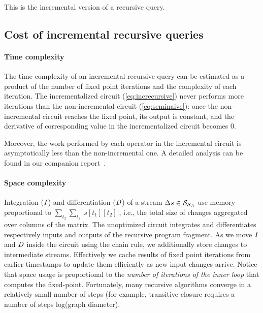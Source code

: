 \noindent This is the incremental version of a recursive query.



\subsection{Cost of incremental recursive queries}

\paragraph{Time complexity}

The time complexity of an incremental recursive query can be estimated as a product of
the number of fixed point iterations and the complexity of each iteration. The
incrementalized circuit (\ref{eq:increcursive}) never performs more
iterations than the non-incremental circuit (\ref{eq:seminaive}):
once the non-incremental circuit reaches the fixed point, its output is constant,
and the derivative of corresponding value in the incrementalized circuit becomes 0.

Moreover, the work performed by each operator in the incremental
circuit is asymptotically less than the non-incremental one.  A
detailed analysis can be found in our companion report~\cite{tr}.


\paragraph{Space complexity} Integration ($\mathit{I}$) and differentiation ($\mathit{D}$) of a
stream $\Delta s \in \mathcal{S}_{\mathcal{S}_{A}}$ use memory proportional to
$\sum_{t_2}\sum_{t_1}|s[t_1][t_2]|$, i.e., the total size of changes
aggregated over columns of the matrix.  The unoptimized circuit integrates
and differentiates respectively inputs and outputs of the recursive program
fragment.  As we move $\mathit{I}$ and $\mathit{D}$ inside the circuit using the chain rule, we
additionally store changes to intermediate streams.  Effectively we cache results of
fixed point iterations from earlier timestamps to update them efficiently as new input changes arrive.
Notice that space usage is proportional to the \emph{number of iterations of the inner loop}
that computes the fixed-point.
Fortunately, many recursive algorithms converge in a relatively small number of steps
(for example, transitive closure requires a number of steps  log(graph diameter).
